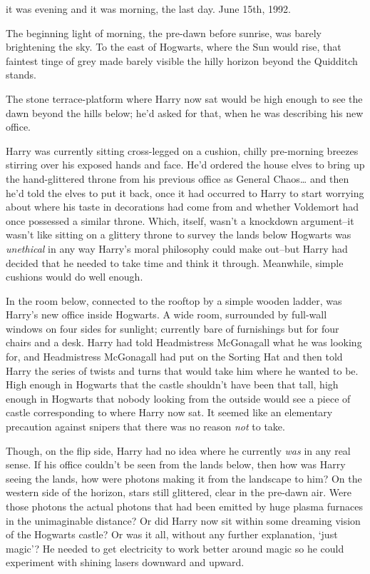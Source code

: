 
 it was evening and it was morning, the last day. June 15th, 1992.

\hplettrineextrapara
The beginning light of morning, the pre-dawn before sunrise, was barely brightening the sky. To the east of Hogwarts, where the Sun would rise, that faintest tinge of grey made barely visible the hilly horizon beyond the Quidditch stands.

The stone terrace-platform where Harry now sat would be high enough to see the dawn beyond the hills below; he'd asked for that, when he was describing his new office.

Harry was currently sitting cross-legged on a cushion, chilly pre-morning breezes stirring over his exposed hands and face. He'd ordered the house elves to bring up the hand-glittered throne from his previous office as General Chaos{\ldots} and then he'd told the elves to put it back, once it had occurred to Harry to start worrying about where his taste in decorations had come from and whether Voldemort had once possessed a similar throne. Which, itself, wasn't a knockdown argument\---it wasn't like sitting on a glittery throne to survey the lands below Hogwarts was \emph{unethical} in any way Harry's moral philosophy could make out\---but Harry had decided that he needed to take time and think it through. Meanwhile, simple cushions would do well enough.

In the room below, connected to the rooftop by a simple wooden ladder, was Harry's new office inside Hogwarts. A wide room, surrounded by full-wall windows on four sides for sunlight; currently bare of furnishings but for four chairs and a desk. Harry had told Headmistress McGonagall what he was looking for, and Headmistress McGonagall had put on the Sorting Hat and then told Harry the series of twists and turns that would take him where he wanted to be. High enough in Hogwarts that the castle shouldn't have been that tall, high enough in Hogwarts that nobody looking from the outside would see a piece of castle corresponding to where Harry now sat. It seemed like an elementary precaution against snipers that there was no reason \emph{not} to take.

Though, on the flip side, Harry had no idea where he currently \emph{was} in any real sense. If his office couldn't be seen from the lands below, then how was Harry seeing the lands, how were photons making it from the landscape to him? On the western side of the horizon, stars still glittered, clear in the pre-dawn air. Were those photons the actual photons that had been emitted by huge plasma furnaces in the unimaginable distance? Or did Harry now sit within some dreaming vision of the Hogwarts castle? Or was it all, without any further explanation, `just magic'? He needed to get electricity to work better around magic so he could experiment with shining lasers downward and upward.

